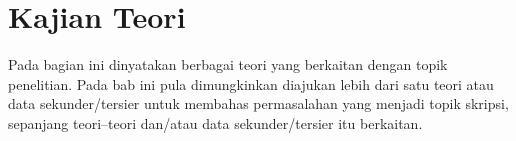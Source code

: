 \section{Kajian Teori}
Pada bagian ini dinyatakan berbagai teori yang berkaitan dengan topik penelitian. Pada bab ini pula dimungkinkan diajukan lebih dari satu teori atau data sekunder/tersier untuk membahas permasalahan yang menjadi topik skripsi, sepanjang teori–teori dan/atau data sekunder/tersier itu berkaitan.

